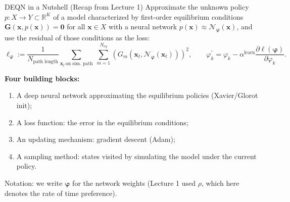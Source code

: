 \documentclass[aspectratio=169,11pt]{beamer}
\newcommand{\emphc}[1]{\textcolor{harvardcrimson}{#1}}
\newcommand{\x}{\bm{x}}
\newcommand{\R}{\mathbb{R}}
\newcommand{\nn}{\mathcal{N}_{\bm{\varphi}}}
\begin{document}
\begin{frame}{DEQN in a Nutshell (Recap from Lecture 1)}
\small
Approximate the unknown policy $p: X \to Y \subset \R^K$ of a model characterized by first-order equilibrium conditions $\mathbf{G}(\x, p(\x)) = \bm{0}$ for all $\x \in X$ with a neural network $p(\x) \approx \nn(\x)$, and use the residual of those conditions as the loss:
\[
\ell_{\bm{\varphi}} := \frac{1}{N_{\text{path length}}}\sum_{\x_t \,\text{on sim.\ path}}\ \sum_{m=1}^{N_{eq}}\left(G_{m}(\x_t, \nn(\x_t))\right)^2 ,
\qquad
\varphi^{\prime}_{k}=\varphi_{k} - \alpha^{\text{learn}} \frac{\partial \ell(\bm{\varphi})}{\partial \varphi_{k}} .
\]

\vspace{0.15cm}
\textbf{Four building blocks:}
\begin{enumerate}
    \item A deep neural network approximating the equilibrium policies (Xavier/Glorot init);
    \item A loss function: the error in the equilibrium conditions;
    \item An updating mechanism: gradient descent (Adam);
    \item A sampling method: states visited by \emphc{simulating the model} under the current policy.
\end{enumerate}

\vspace{0.1cm}
{\footnotesize Notation: we write $\bm{\varphi}$ for the network weights (Lecture 1 used $\rho$, which here denotes the rate of time preference).}
\end{frame}
\end{document}
